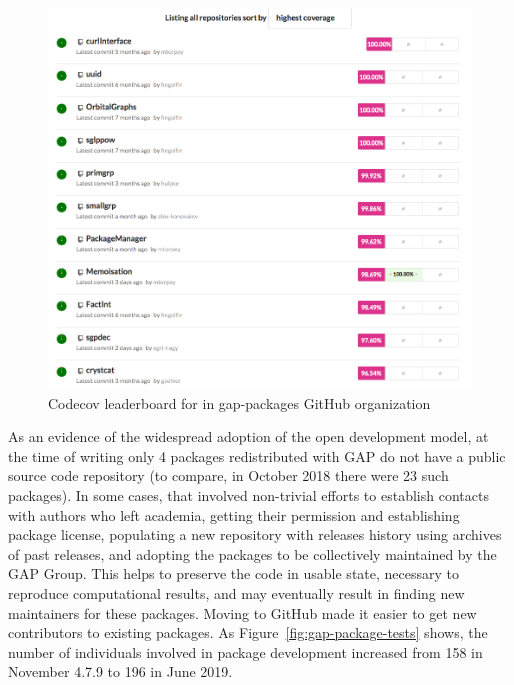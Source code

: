 \documentclass{deliverablereport}
\begin{document}
\begin{figure}[!ht]
    \centering
    \includegraphics[width=\textwidth]{images/gap-packages-codecov}
    \caption{Codecov leaderboard for in gap-packages GitHub organization}
    \label{fig:gap-packages-codecov}
\end{figure}

As an evidence of the widespread adoption of the open development model, 
at the time of writing only 4 packages redistributed with GAP do not have a public 
source code repository (to compare, in October 2018 there were 23 such 
packages). In some cases, that involved non-trivial efforts to establish 
contacts with authors who left academia, getting their permission and 
establishing package license, populating a new repository with releases 
history using archives of past releases, and adopting the packages to
be collectively maintained by the GAP Group. This helps to preserve the
code in usable state, necessary to reproduce computational results, and
may eventually result in finding new maintainers for these packages.
Moving to GitHub made it easier to get new contributors to existing
packages. As Figure~\ref{fig:gap-package-tests}
shows, the number of individuals involved in package development increased from 158 in
November 4.7.9 to 196 in June 2019. 
\end{document}
